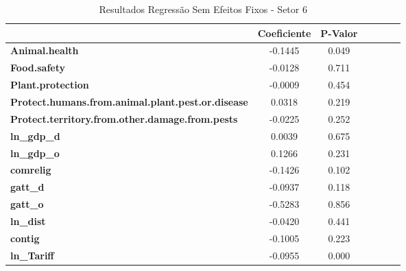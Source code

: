 \begin{table}[ht]
    
    \begin{center}
        \begin{tabular}{lcccccc}
            & \textbf{Coeficiente} & \textbf{P-Valor}\\
            \midrule
\textbf{Animal.health}                                    &      -0.1445 &         0.049\\
\textbf{Food.safety}                                      &      -0.0128 &         0.711\\
\textbf{Plant.protection}                                 &      -0.0009 &         0.454\\
\textbf{Protect.humans.from.animal.plant.pest.or.disease} &       0.0318 &         0.219\\
\textbf{Protect.territory.from.other.damage.from.pests}   &      -0.0225 &         0.252\\
\textbf{ln\_gdp\_d}                                       &       0.0039 &         0.675\\
\textbf{ln\_gdp\_o}                                       &       0.1266 &         0.231\\
\textbf{comrelig}                                         &      -0.1426 &         0.102\\
\textbf{gatt\_d}                                          &      -0.0937 &         0.118\\
\textbf{gatt\_o}                                          &      -0.5283 &         0.856\\
\textbf{ln\_dist}                                         &      -0.0420 &         0.441\\
\textbf{contig}                                           &      -0.1005 &         0.223\\
\textbf{ln\_Tariff}                                       &      -0.0955 &         0.000\\
\bottomrule
\end{tabular}
\caption{Resultados Regressão Sem Efeitos Fixos - Setor 6}
\end{center}
\end{table}